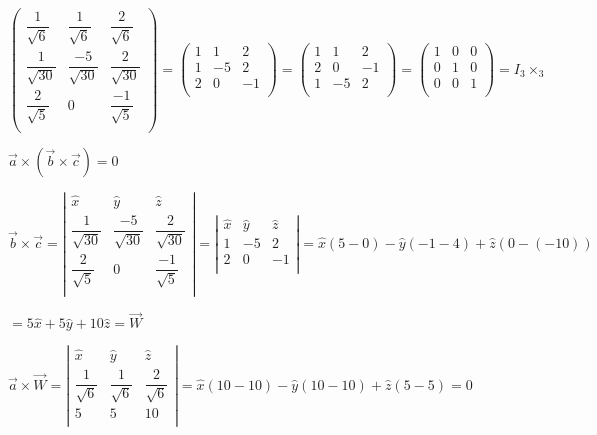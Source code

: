 \documentclass[fleqn]{article}
\begin{document}
\begin{enumerate}
\noindent
$\displaystyle
  \begin{pmatrix}
    \dfrac{1}{\sqrt{6}} & \dfrac{1}{\sqrt{6}} & \dfrac{2}{\sqrt{6}}  \\
    \dfrac{1}{\sqrt{30}} & \dfrac{-5}{\sqrt{30}} & \dfrac{2}{\sqrt{30}} \\ 
    \dfrac{2}{\sqrt{5}} & 0 & \dfrac{-1}{\sqrt{5}} \\ 
  \end{pmatrix}
  =
  \begin{pmatrix}
    1 & 1 & 2\\
    1 & -5 & 2 \\ 
    2 & 0 & -1 \\ 
  \end{pmatrix}
  = 
  \begin{pmatrix}
    1 & 1 & 2\\
    2 & 0 & -1\\ 
    1 & -5 & 2\\ 
  \end{pmatrix}
  = 
  \begin{pmatrix}
    1 & 0 & 0\\
    0 & 1 & 0\\ 
    0 & 0 & 1\\ 
  \end{pmatrix}
  =
  I_3\times_3
$

\bigbreak


$
\overrightarrow{a}\times(\overrightarrow{b}\times\overrightarrow{c})=0
$

$
\overrightarrow{b}\times\overrightarrow{c}
=
\left|
\begin{matrix}
  \hat{x} & \hat{y} & \hat{z} \\
  \dfrac{1}{\sqrt{30}} & \dfrac{-5}{\sqrt{30}} & \dfrac{2}{\sqrt{30}} \\ 
  \dfrac{2}{\sqrt{5}} & 0 & \dfrac{-1}{\sqrt{5}} \\ 
\end{matrix}
\right|
=
\left|
\begin{matrix}
  \hat{x} & \hat{y} & \hat{z} \\
  1 & -5 & 2 \\ 
  2 & 0 & -1 \\ 
\end{matrix}
\right|
=
\hat{x}(5-0)-\hat{y}(-1-4)+\hat{z}(0-(-10))
$

$
=
5\hat{x}+5\hat{y}+10\hat{z}
=\overrightarrow{W}
$


$
\overrightarrow{a}\times\overrightarrow{W}
=
\left|
\begin{matrix}
  \hat{x} & \hat{y} & \hat{z} \\
  \dfrac{1}{\sqrt{6}} & \dfrac{1}{\sqrt{6}} & \dfrac{2}{\sqrt{6}}  \\ 
  5 & 5 & 10 \\ 
\end{matrix}
\right|
=
\hat{x}(10-10)-\hat{y}(10-10)+\hat{z}(5-5)
=
0
$


\end{enumerate}
\end{document}
